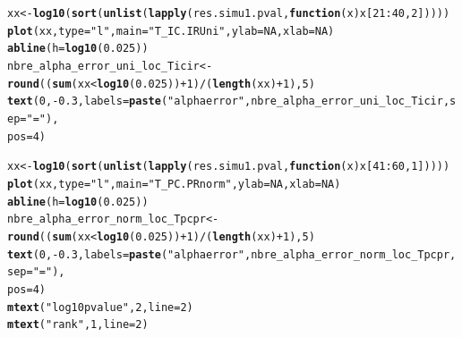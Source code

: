 \documentclass[12pt]{article}\usepackage[]{graphicx}\usepackage[]{color}
\makeatletter
\newcommand{\hlnum}[1]{\textcolor[rgb]{0.686,0.059,0.569}{#1}}%
\newcommand{\hlstr}[1]{\textcolor[rgb]{0.192,0.494,0.8}{#1}}%
\newcommand{\hlopt}[1]{\textcolor[rgb]{0,0,0}{#1}}%
\newcommand{\hlstd}[1]{\textcolor[rgb]{0.345,0.345,0.345}{#1}}%
\newcommand{\hlkwa}[1]{\textcolor[rgb]{0.161,0.373,0.58}{\textbf{#1}}}%
\newcommand{\hlkwb}[1]{\textcolor[rgb]{0.69,0.353,0.396}{#1}}%
\newcommand{\hlkwc}[1]{\textcolor[rgb]{0.333,0.667,0.333}{#1}}%
\newcommand{\hlkwd}[1]{\textcolor[rgb]{0.737,0.353,0.396}{\textbf{#1}}}%
\newenvironment{kframe}{%
 \def\at@end@of@kframe{}%
 \ifinner\ifhmode%
  \def\at@end@of@kframe{\end{minipage}}%
  \begin{minipage}{\columnwidth}%
 \fi\fi%
 \def\FrameCommand##1{\hskip\@totalleftmargin \hskip-\fboxsep
 \colorbox{shadecolor}{##1}\hskip-\fboxsep
     \hskip-\linewidth \hskip-\@totalleftmargin \hskip\columnwidth}%
 \MakeFramed {\advance\hsize-\width
   \@totalleftmargin\z@ \linewidth\hsize
   \@setminipage}}%
 {\par\unskip\endMakeFramed%
 \at@end@of@kframe}
\newenvironment{knitrout}{}{} %
\makeatother
\begin{document}
\begin{knitrout}
\begin{kframe}
\begin{alltt}
\hlstd{xx} \hlkwb{<-} \hlkwd{log10}\hlstd{(}\hlkwd{sort}\hlstd{(}\hlkwd{unlist}\hlstd{(}\hlkwd{lapply}\hlstd{(res.simu1.pval,} \hlkwa{function}\hlstd{(}\hlkwc{x}\hlstd{) x[}\hlnum{21}\hlopt{:}\hlnum{40}\hlstd{,} \hlnum{2}\hlstd{]))))}
\hlkwd{plot}\hlstd{(xx,} \hlkwc{type} \hlstd{=} \hlstr{"l"}\hlstd{,} \hlkwc{main} \hlstd{=} \hlstr{"T_IC.IR Uni"}\hlstd{,} \hlkwc{ylab} \hlstd{=} \hlnum{NA}\hlstd{,} \hlkwc{xlab} \hlstd{=} \hlnum{NA}\hlstd{)}
\hlkwd{abline}\hlstd{(}\hlkwc{h} \hlstd{=} \hlkwd{log10}\hlstd{(}\hlnum{0.025}\hlstd{))}
\hlstd{nbre_alpha_error_uni_loc_Ticir} \hlkwb{<-} \hlkwd{round}\hlstd{((}\hlkwd{sum}\hlstd{(xx} \hlopt{<} \hlkwd{log10}\hlstd{(}\hlnum{0.025}\hlstd{))} \hlopt{+}\hlnum{1} \hlstd{)} \hlopt{/} \hlstd{(}\hlkwd{length}\hlstd{(xx)}\hlopt{+}\hlnum{1}\hlstd{),} \hlnum{5}\hlstd{)}
\hlkwd{text}\hlstd{(}\hlnum{0}\hlstd{,} \hlopt{-}\hlnum{0.3}\hlstd{,} \hlkwc{labels} \hlstd{=} \hlkwd{paste}\hlstd{(}\hlstr{"alpha error"}\hlstd{, nbre_alpha_error_uni_loc_Ticir,} \hlkwc{sep} \hlstd{=} \hlstr{" = "}\hlstd{),}
     \hlkwc{pos} \hlstd{=} \hlnum{4}\hlstd{)}

\hlstd{xx} \hlkwb{<-} \hlkwd{log10}\hlstd{(}\hlkwd{sort}\hlstd{(}\hlkwd{unlist}\hlstd{(}\hlkwd{lapply}\hlstd{(res.simu1.pval,} \hlkwa{function}\hlstd{(}\hlkwc{x}\hlstd{) x[}\hlnum{41}\hlopt{:}\hlnum{60}\hlstd{,} \hlnum{1}\hlstd{]))))}
\hlkwd{plot}\hlstd{(xx,} \hlkwc{type} \hlstd{=} \hlstr{"l"}\hlstd{,} \hlkwc{main} \hlstd{=} \hlstr{"T_PC.PR norm"}\hlstd{,} \hlkwc{ylab} \hlstd{=} \hlnum{NA}\hlstd{,} \hlkwc{xlab} \hlstd{=} \hlnum{NA}\hlstd{)}
\hlkwd{abline}\hlstd{(}\hlkwc{h} \hlstd{=} \hlkwd{log10}\hlstd{(}\hlnum{0.025}\hlstd{))}
\hlstd{nbre_alpha_error_norm_loc_Tpcpr} \hlkwb{<-} \hlkwd{round}\hlstd{((}\hlkwd{sum}\hlstd{(xx} \hlopt{<} \hlkwd{log10}\hlstd{(}\hlnum{0.025}\hlstd{))} \hlopt{+}\hlnum{1} \hlstd{)} \hlopt{/} \hlstd{(}\hlkwd{length}\hlstd{(xx)}\hlopt{+}\hlnum{1}\hlstd{),} \hlnum{5}\hlstd{)}
\hlkwd{text}\hlstd{(}\hlnum{0}\hlstd{,} \hlopt{-}\hlnum{0.3}\hlstd{,} \hlkwc{labels} \hlstd{=} \hlkwd{paste}\hlstd{(}\hlstr{"alpha error"}\hlstd{, nbre_alpha_error_norm_loc_Tpcpr,} \hlkwc{sep} \hlstd{=} \hlstr{" = "}\hlstd{),}
     \hlkwc{pos} \hlstd{=} \hlnum{4}\hlstd{)}
\hlkwd{mtext}\hlstd{(}\hlstr{"log10 pvalue"}\hlstd{,} \hlnum{2}\hlstd{,} \hlkwc{line} \hlstd{=} \hlnum{2}\hlstd{)}
\hlkwd{mtext}\hlstd{(}\hlstr{"rank"}\hlstd{,} \hlnum{1}\hlstd{,} \hlkwc{line} \hlstd{=} \hlnum{2}\hlstd{)}


\end{alltt}
\end{kframe}
\end{knitrout}
\end{document}
